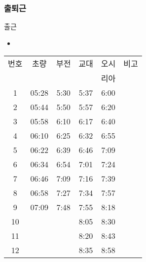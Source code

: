 \documentclass[aspectratio=1610,20pt,xcolor=pdftex,dvipsnames,table,handout]{beamer}
\begin{document}
		\begin{frame} [t,plain]
		\frametitle{출퇴근}

			\begin{block} {출근}
			\setlength{\leftmargini}{2em}			
			\begin{itemize}
				\item 
			\end{itemize}
			\end{block}						

		   \begin{center}
			\label{table:second}
			\setlength{\tabcolsep}{2pt}
			\small
		     	\begin{tabular}{ c |c|c|c|c|c} \hline
				번호  	& 초량 		& 	부전  	& 교대 		& 오시 		&비고  \\ 
					  	& 	 		& 		  	& 	 		& 리아 		&	  \\ \hline  \hline
				1  		& 	05:28	&	5:30		&	5:37		&	6:00		&  \\ \hline
				2  		& 	05:44	&	5:50		&	5:57		&	6:20		&  \\ \hline
				3  		& 	05:58	&	6:10		&	6:17		&	6:40		&  \\ \hline
				4  		& 	06:10	&	6:25		&	6:32		&	6:55		&  \\ \hline
				5  		& 	06:22	&	6:39		&	6:46		&	7:09		&  \\ \hline
				6  		& 	06:34	&	6:54		&	7:01		&	7:24		&  \\ \hline
				7  		& 	06:46	&	7:09		&	7:16		&	7:39		&  \\ \hline
				8  		& 	06:58	&	7:27		&	7:34		&	7:57		&  \\ \hline
				9  		& 	07:09	&	7:48		&	7:55		&	8:18		&  \\ \hline
				10  		& 			&			&	8:05		&	8:30		&  \\ \hline
				11  		& 			&			&	8:20		&	8:43		&  \\ \hline
				12  		& 			&			&	8:35		&	8:58		&  \\ \hline
			\end{tabular}
			\end{center}%



		\end{frame}						
\end{document}
